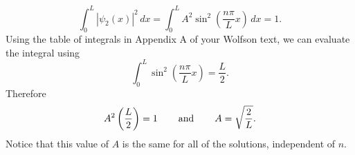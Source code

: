 \begin{equation}
\int_0^L |\psi_2(x)|^2\, dx 
  = \int_0^L A^2 \sin^2\left(\frac{n \pi}{L}x\right)\, dx = 1 .
\end{equation}
Using the table of integrals in Appendix A of your Wolfson text,
we can evaluate the integral using
\begin{equation}
\int_0^L \sin^2\left(\frac{n \pi}{L} x\right) = \frac{L}{2} .
\end{equation}
Therefore
\begin{equation}
A^2 \left( \frac{L}{2} \right) = 1 \hspace{0.3in} 
              \mbox{and} \hspace{0.3in} A = \sqrt{\frac{2}{L}} .
\end{equation}
Notice that this value of $A$ is the same for all of the solutions,
independent of $n$.

